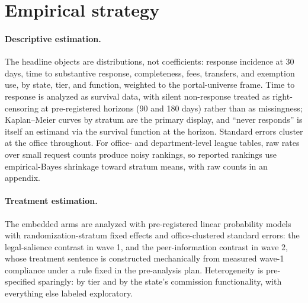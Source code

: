 \documentclass[11pt]{article}
\begin{document}
\section{Empirical strategy}
\label{sec:analysis}

\paragraph{Descriptive estimation.} The headline objects are distributions, not coefficients: response incidence at 30 days, time to substantive response, completeness, fees, transfers, and exemption use, by state, tier, and function, weighted to the portal-universe frame. Time to response is analyzed as survival data, with silent non-response treated as right-censoring at pre-registered horizons (90 and 180 days) rather than as missingness; Kaplan--Meier curves by stratum are the primary display, and ``never responds'' is itself an estimand via the survival function at the horizon. Standard errors cluster at the office throughout. For office- and department-level league tables, raw rates over small request counts produce noisy rankings, so reported rankings use empirical-Bayes shrinkage toward stratum means, with raw counts in an appendix.

\paragraph{Treatment estimation.} The embedded arms are analyzed with pre-registered linear probability models with randomization-stratum fixed effects and office-clustered standard errors: the legal-salience contrast in wave 1, and the peer-information contrast in wave 2, whose treatment sentence is constructed mechanically from measured wave-1 compliance under a rule fixed in the pre-analysis plan. Heterogeneity is pre-specified sparingly: by tier and by the state's commission functionality, with everything else labeled exploratory.
\end{document}
